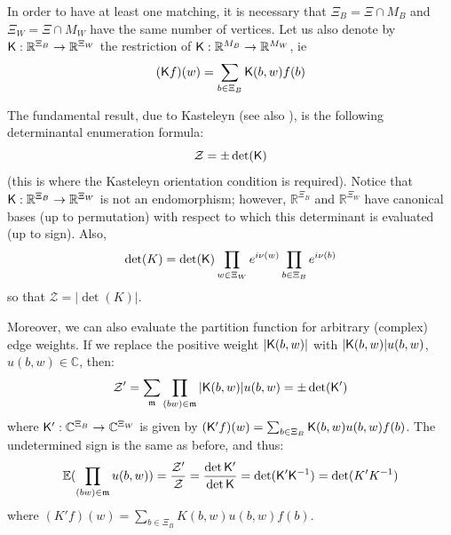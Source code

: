 \documentclass[10pt]{article}
\newcommand{\R}{\mathbb{R}}
\newcommand{\C}{\mathbb{C}}
\newcommand{\E}{\mathbb{E}}
\newcommand{\rK}{{\sf K}}
\newcommand{\mfm}{{\mathfrak m}}
\begin{document}
In order to have at least one matching, it is necessary that $\Xi_B=\Xi\cap M_B$ and $\Xi_W=\Xi\cap M_W$ have the same number of vertices. Let us also denote by $\rK:\R^{\Xi_B}\rightarrow\R^{\Xi_W}$ the restriction of $\rK:\R^{M_B}\rightarrow\R^{M_W}$, ie 
$$(\rK f)(w)=\sum_{b\in \Xi_B}\rK(b,w)f(b)$$

The fundamental result, due to Kasteleyn \cite{Kas_square} (see also \cite{Per_onemore}), is the following determinantal enumeration formula:
$${\mathcal Z}=\pm\det(\rK)$$
(this is where the Kasteleyn orientation condition is required). Notice that $\rK:\R^{\Xi_B}\rightarrow\R^{\Xi_W}$ is not an endomorphism; however, $\R^{\Xi_B}$ and $\R^{\Xi_W}$ have canonical bases (up to permutation) with respect to which this determinant is evaluated (up to sign). Also, 
$$\det(K)=\det(\rK)\prod_{w\in\Xi_W} e^{i\nu(w)}\prod_{b\in\Xi_B} e^{i\nu(b)}$$
so that ${\mathcal Z}=|\det(K)|$.

Moreover, we can also evaluate the partition function for arbitrary (complex) edge weights. If we replace the positive weight $|\rK(b,w)|$ with $|\rK(b,w)|u(b,w)$, $u(b,w)\in\C$, then:
$${\mathcal Z}'=\sum_\mfm\prod_{(bw)\in\mfm}|\rK(b,w)|u(b,w)=\pm\det(\rK')$$
where $\rK':\C^{\Xi_B}\rightarrow\C^{\Xi_W}$ is given by $(\rK'f)(w)=\sum_{b\in\Xi_B}\rK(b,w)u(b,w)f(b)$. The undetermined sign is the same as before, and thus:
\begin{equation}\label{eq:ratiopart}
\E(\prod_{(bw)\in\mfm}u(b,w))=\frac{{\mathcal Z'}}{{\mathcal Z}}=\frac{{\det \rK'}}{\det \rK}=\det(\rK'\rK^{-1})=\det(K'K^{-1})
\end{equation}
where $(K'f)(w)=\sum_{b\in\Xi_B}K(b,w)u(b,w)f(b)$.
\end{document}
